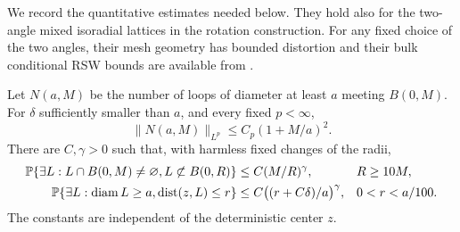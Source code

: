 We record the quantitative estimates needed below.  They hold also
for the two-angle mixed isoradial lattices in the rotation
construction.  For any fixed choice of the two angles, their mesh
geometry has bounded distortion and their bulk conditional RSW
bounds are available from
\cite[Theorem~2.2, Remark~2.3 and Proposition~2.12]{DCKKMO2026Rotation}.

\begin{lemma}
\label{lem:rr-estimates}
Let $N(a,M)$ be the number of loops of diameter at least $a$ meeting
$B(0,M)$.  For $\delta$ sufficiently smaller than $a$, and every
fixed $p<\infty$,
\begin{equation}
 \|N(a,M)\|_{L^p}\le C_p(1+M/a)^2.
 \label{eq:rr-count}
\end{equation}
There are $C,\gamma>0$ such that, with harmless fixed changes of the
radii,
\begin{align}
 \mathbb P\{\exists L:L\cap B(0,M)\ne\varnothing,
                            L\not\subset B(0,R)\}
      &\le C(M/R)^\gamma, && R\ge10M,
       \label{eq:rr-escape}\\
 \mathbb P\{\exists L:\operatorname{diam} L\ge a,
                       \operatorname{dist}(z,L)\le r\}
      &\le C\bigl((r+C\delta)/a\bigr)^\gamma,
          &&0<r<a/100.
       \label{eq:rr-point}
\end{align}
The constants are independent of the deterministic center $z$.
\end{lemma}

